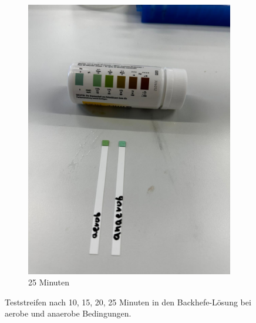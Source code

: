 \documentclass[10pt,a4paper]{article}
\begin{document}
\begin{figure}[H]
\begin{subfigure}[b]{0.4\textwidth}
			\includegraphics[width=\textwidth]{PHOTO-2024-07-04-23-51-29.jpg}
			\caption{25 Minuten}
			\label{fig:25 min}
		\end{subfigure}
		\caption{Teststreifen nach 10, 15, 20, 25 Minuten in den Backhefe-Lösung bei aerobe und anaerobe Bedingungen.}
		\label{fig: Glucoseverbrauch}
	\end{figure}
			
\end{document}
